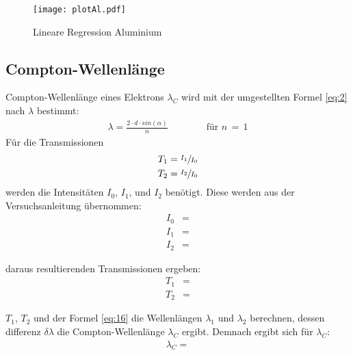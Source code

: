     \begin{figure}[H]
        \centering
        \texttt{[image: plotAl.pdf]}
        \caption{Lineare Regression Aluminium}
        \label{fig:3}
    \end{figure}

    \subsection{Compton-Wellenlänge}

    \justifying Compton-Wellenlänge eines Elektrons $\lambda_C$ wird mit der umgestellten Formel \eqref{eq:2} nach $\lambda$ bestimmt:
    \begin{align}
        \lambda = \frac{2 \cdot d \cdot sin(\alpha)}{n} \qquad \qquad \text{für $n\,=\,1$} \label{eq:17}
    \end{align} 
    Für die Transmissionen
    \begin{align}
        T_1 &= \sfrac{I_1}{I_0} \\
        T_2 &= \sfrac{I_2}{I_0} 
    \end{align}
    werden die Intensitäten $I_0$, $I_1$, und $I_2$ benötigt. Diese werden aus der Versuchsanleitung \cite{V603} übernommen:
    \begin{subequations}\label{eq:18}
    \begin{align}
        I_0 &= \text{} \label{eq:18a}\\
        I_1 &= \text{} \label{eq:18b}\\
        I_2 &= \text{} \label{eq:18c}
    \end{align}
    \end{subequations}

    \justifying daraus resultierenden Transmissionen ergeben:
    \begin{align}
        T_1 &= \text{} \label{eq:19}\\
        T_2 &= \text{} \label{eq:20}
    \end{align}

    \justifying $T_1$, $T_2$ und der Formel \eqref{eq:16} die Wellenlängen $\lambda_1$ und $\lambda_2$ berechnen, dessen differenz $\delta \lambda$ die Compton-Wellenlänge $\lambda_C$ ergibt.
    Demnach ergibt sich für $\lambda_C$:
    \begin{align}
        \lambda_C = \text{} \label{eq:21}
    \end{align}


